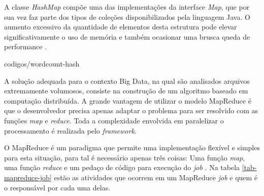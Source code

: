 A classe \textit{HashMap} compõe uma das implementações da interface \textit{Map}, que por sua vez faz parte dos tipos de coleções disponibilizados pela linguagem Java. O aumento excessivo da quantidade de elementos desta estrutura pode elevar significativamente o uso de memória e também ocasionar uma brusca queda de performance \cite{oaks2014}.


		{codigos/wordcount-hash}

A solução adequada para o contexto Big Data, na qual são analisados arquivos extremamente volumosos, consiste na construção de um algoritmo baseado em computação distribuída. A grande vantagem de utilizar o modelo MapReduce é que o desenvolvedor precisa apenas adaptar o problema para ser resolvido com as funções \textit{map} e \textit{reduce}. Toda a complexidade envolvida em paralelizar o processamento é realizada pelo \textit{framework}.

O MapReduce é um paradigma que permite uma implementação flexível e simples para esta situação, para tal é necessário apenas três coisas: Uma função \textit{map}, uma função \textit{reduce} e um pedaço de código para execução do \textit{job} \cite{white2012}. Na tabela \ref{tab-mapreduce-job} estão as atividades que ocorrem em um MapReduce \textit{job} e quem é o responsável por cada uma delas.

